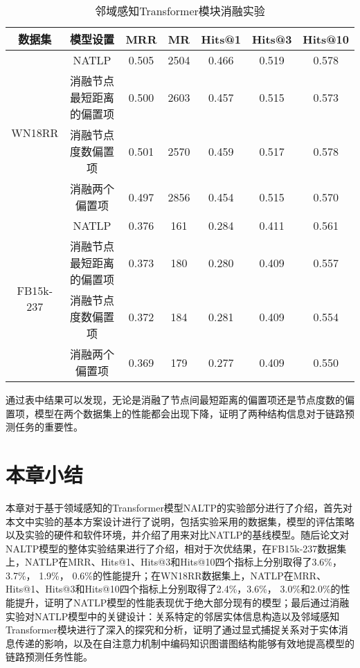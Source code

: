 \begin{table}[htbp]
  \begin{center}
      \caption{邻域感知Transformer模块消融实验}
      \setlength{\tabcolsep}{8pt}
      \renewcommand\arraystretch{1.5}
      \begin{tabular}{*{7}{c}}
          \toprule
          数据集 & 模型设置 & MRR&MR&Hits@1&Hits@3&	Hits@10\\
          \midrule
          \multirow{4}{*}{WN18RR}&NATLP&0.505&2504&0.466&0.519&0.578\\
          &消融节点最短距离的偏置项&0.500&2603&0.457&0.515&0.573\\
          &消融节点度数偏置项&0.501&2570&0.459&0.517&0.578\\
          &消融两个偏置项&0.497&2856&0.454&0.515&0.570\\
          \cmidrule{1-7}
          \multirow{4}{*}{FB15k-237}&NATLP&0.376&161&0.284&0.411&0.561\\
          &消融节点最短距离的偏置项&0.373&180&0.280&0.409&0.557\\
          &消融节点度数偏置项&0.372&184&0.281&0.409&0.554\\
          &消融两个偏置项&0.369&179&0.277&0.409&0.550\\
          \bottomrule
      \end{tabular}
      \label{NATLP_ablation2}
  \end{center}
\end{table}

通过表中结果可以发现，无论是消融了节点间最短距离的偏置项还是节点度数的偏置项，模型在两个数据集上的性能都会出现下降，证明了两种结构信息对于链路预测任务的重要性。


\section{本章小结}

本章对于基于领域感知的Transformer模型NALTP的实验部分进行了介绍，首先对本文中实验的基本方案设计进行了说明，包括实验采用的数据集，模型的评估策略以及实验的硬件和软件环境，并介绍了用来对比NATLP的基线模型。随后论文对NALTP模型的整体实验结果进行了介绍，相对于次优结果，在FB15k-237数据集上，NATLP在MRR、Hits@1、Hits@3和Hits@10四个指标上分别取得了3.6\%，3.7\%， 1.9\%， 0.6\%的性能提升；在WN18RR数据集上，NATLP在MRR、Hits@1、Hits@3和Hits@10四个指标上分别取得了2.4\%，3.6\%， 3.0\%和2.0\%的性能提升，证明了NATLP模型的性能表现优于绝大部分现有的模型；最后通过消融实验对NATLP模型中的关键设计：关系特定的邻居实体信息构造以及邻域感知Transformer模块进行了深入的探究和分析，证明了通过显式捕捉关系对于实体消息传递的影响，以及在自注意力机制中编码知识图谱图结构能够有效地提高模型的链路预测任务性能。